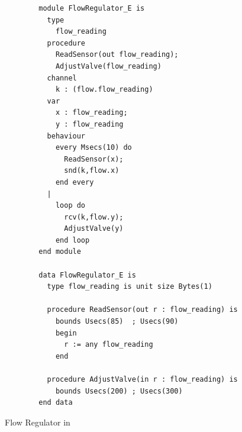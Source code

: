 \begin{figure}
\begin{center}
\begin{minipage}{.75\linewidth}
\scriptsize
\begin{verbatim}
        module FlowRegulator_E is
          type
            flow_reading
          procedure
            ReadSensor(out flow_reading);
            AdjustValve(flow_reading)
          channel
            k : (flow.flow_reading)
          var
            x : flow_reading;
            y : flow_reading
          behaviour 
            every Msecs(10) do
              ReadSensor(x);
              snd(k,flow.x)
            end every
          | 
            loop do
              rcv(k,flow.y);
              AdjustValve(y)
            end loop
        end module

        data FlowRegulator_E is
          type flow_reading is unit size Bytes(1)

          procedure ReadSensor(out r : flow_reading) is
            bounds Usecs(85)  ; Usecs(90)
            begin
              r := any flow_reading
            end

          procedure AdjustValve(in r : flow_reading) is 
            bounds Usecs(200) ; Usecs(300) 
        end data
\end{verbatim}
\end{minipage}
\end{center}
\caption{Flow Regulator in \candle\label{fig:prcanflow}}
\end{figure}

